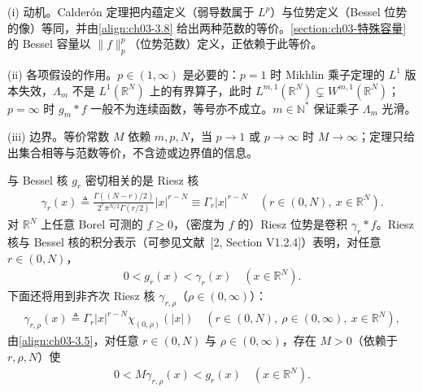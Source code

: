 \documentclass[../../main.tex]{subfiles}%
\begin{document}
\begin{remark}\label{remark:ch03-Calderon动机}
(i) 动机。Calderón 定理把内蕴定义（弱导数属于 $L^p$）与位势定义（Bessel 位势的像）等同，并由\eqref{align:ch03-3.8} 给出两种范数的等价。\cref{section:ch03-特殊容量}的 Bessel 容量以 $\|f\|_p^p$（位势范数）定义，正依赖于此等价。

(ii) 各项假设的作用。$p\in(1,\infty)$ 是必要的：$p=1$ 时 Mikhlin 乘子定理的 $L^1$ 版本失效，$\Lambda_m$ 不是 $L^1(\mathbb{R}^N)$ 上的有界算子，此时 $L^{m,1}(\mathbb{R}^N)\subsetneq W^{m,1}(\mathbb{R}^N)$；$p=\infty$ 时 $g_m*f$ 一般不为连续函数，等号亦不成立。$m\in\mathbb{N}^*$ 保证乘子 $\Lambda_m$ 光滑。

(iii) 边界。等价常数 $M$ 依赖 $m,p,N$，当 $p\to1$ 或 $p\to\infty$ 时 $M\to\infty$；定理只给出集合相等与范数等价，不含迹或边界值的信息。
\end{remark}

\begin{remark}\label{remark:ch03-Riesz核}
与 Bessel 核 $g_r$ 密切相关的是 Riesz 核
\begin{align}
\gamma_r(x)\triangleq \frac{\Gamma((N-r)/2)}{2^r\pi^{N/2}\Gamma(r/2)}|x|^{r-N}
\equiv\Gamma_r|x|^{r-N}
\quad (r\in(0,N),\ x\in\mathbb{R}^N).\label{align:ch03-3.9}
\end{align}
对 $\mathbb{R}^N$ 上任意 Borel 可测的 $f\geqslant0$，（密度为 $f$ 的）Riesz 位势是卷积 $\gamma_r*f$。Riesz 核与 Bessel 核的积分表示（可参见文献~[2, Section V1.2.4]）表明，对任意 $r\in(0,N)$，
\begin{align}
0<g_r(x)<\gamma_r(x)\quad (x\in\mathbb{R}^N).\label{align:ch03-3.10}
\end{align}
下面还将用到非齐次 Riesz 核 $\gamma_{r,\rho}$（$\rho\in(0,\infty)$）：
\begin{align}
\gamma_{r,\rho}(x)\triangleq \Gamma_r|x|^{r-N}\chi_{(0,\rho)}(|x|)\quad (r\in(0,N),\ \rho\in(0,\infty),\ x\in\mathbb{R}^N),\label{align:ch03-3.11}
\end{align}
由\eqref{align:ch03-3.5}，对任意 $r\in(0,N)$ 与 $\rho\in(0,\infty)$，存在 $M>0$（依赖于 $r,\rho,N$）使
\begin{align}
0<M\gamma_{r,\rho}(x)<g_r(x)\quad (x\in\mathbb{R}^N).\label{align:ch03-3.12}
\end{align}
\end{remark}
\end{document}
